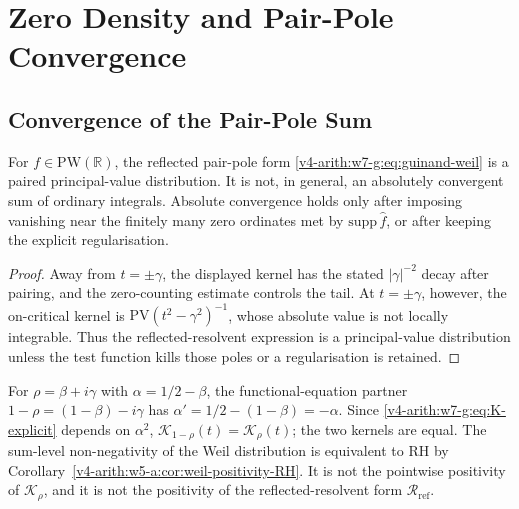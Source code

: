 \section{Zero Density and Pair-Pole Convergence}
\label{v4-arith:w7-g:zero-density}

\subsection{Convergence of the Pair-Pole Sum}
\label{v4-arith:w7-g:zero-density:convergence}

\begin{proposition}
\label{v4-arith:w7-g:prop:pair-pole-converges}
For \(f\in\mathrm{PW}(\mathbb{R})\), the
reflected pair-pole form \eqref{v4-arith:w7-g:eq:guinand-weil} is a paired
principal-value distribution. It is not, in general, an absolutely
convergent sum of ordinary integrals. Absolute convergence holds only
after imposing vanishing near the finitely many zero ordinates met by
\(\mathrm{supp}\,\widehat f\), or after keeping the explicit
regularisation.
\end{proposition}

\begin{proof}
Away from \(t=\pm\gamma\), the displayed kernel has the stated
\(|\gamma|^{-2}\) decay after pairing, and the zero-counting estimate
controls the tail. At \(t=\pm\gamma\), however, the on-critical kernel
is \(\mathrm{PV}(t^{2}-\gamma^{2})^{-1}\), whose absolute value is not
locally integrable. Thus the reflected-resolvent expression is a
principal-value distribution unless the test function kills those
poles or a regularisation is retained.
\end{proof}

\begin{remark}
\label{v4-arith:w7-g:rem:sum-vs-pointwise}
For \(\rho=\beta+i\gamma\) with \(\alpha=1/2-\beta\), the functional-equation
partner \(1-\rho=(1-\beta)-i\gamma\) has \(\alpha'=1/2-(1-\beta)=-\alpha\).
Since \eqref{v4-arith:w7-g:eq:K-explicit} depends on \(\alpha^{2}\),
\(\mathcal{K}_{1-\rho}(t)=\mathcal{K}_{\rho}(t)\); the two kernels are equal.
The sum-level non-negativity of the Weil distribution is equivalent to
RH by Corollary~\ref{v4-arith:w5-a:cor:weil-positivity-RH}. It is not the
pointwise positivity of \(\mathcal K_\rho\), and it is not the
positivity of the reflected-resolvent form
\(\mathcal R_{\mathrm{ref}}\).
\end{remark}

